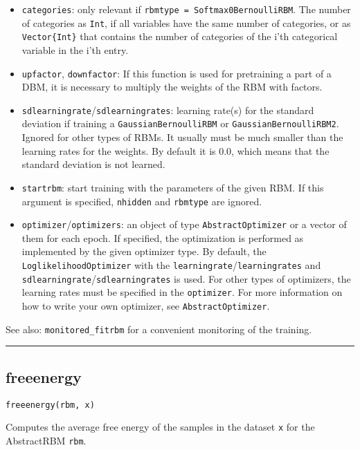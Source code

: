 \begin{itemize}
\item \texttt{categories}: only relevant if \texttt{rbmtype = Softmax0BernoulliRBM}.  The number of categories as \texttt{Int}, if all variables have the same number  of categories, or as \texttt{Vector\{Int\}} that contains the number of categories  of the i'th categorical variable in the i'th entry.


\item \texttt{upfactor}, \texttt{downfactor}: If this function is used for pretraining a part of  a DBM, it is necessary to multiply the weights of the RBM with factors.


\item \texttt{sdlearningrate}/\texttt{sdlearningrates}: learning rate(s) for the  standard deviation if training a \texttt{GaussianBernoulliRBM} or  \texttt{GaussianBernoulliRBM2}. Ignored for other types of RBMs.  It usually must be much smaller than the learning rates for  the weights. By default it is 0.0, which means that the standard deviation  is not learned.


\item \texttt{startrbm}: start training with the parameters of the given RBM.  If this argument is specified, \texttt{nhidden} and \texttt{rbmtype} are ignored.


\item \texttt{optimizer}/\texttt{optimizers}: an object of type \texttt{AbstractOptimizer} or a vector of  them for each epoch. If specified, the optimization is performed as implemented  by the given optimizer type. By default, the \texttt{LoglikelihoodOptimizer}  with the \texttt{learningrate}/\texttt{learningrates} and \texttt{sdlearningrate}/\texttt{sdlearningrates}  is used. For other types of optimizers, the learning rates must be specified  in the \texttt{optimizer}. For more information on how to write your own optimizer,  see \texttt{AbstractOptimizer}.

\end{itemize}
See also: \texttt{monitored\_fitrbm} for a convenient monitoring of the training.

\noindent\rule{\textwidth}{1pt}
\subsection*{freeenergy}
\begin{verbatim}
freeenergy(rbm, x)
\end{verbatim}
Computes the average free energy of the samples in the dataset \texttt{x} for the AbstractRBM \texttt{rbm}.

